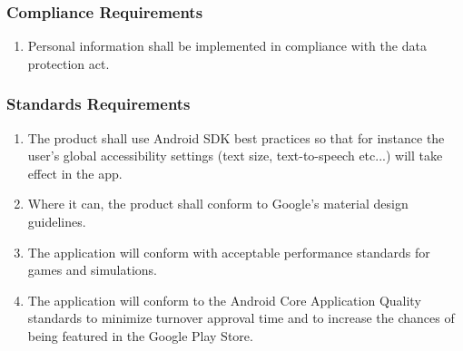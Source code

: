 \documentclass[]{article}
\begin{document}
\subsubsection{Compliance Requirements}
\label{ssub:compliance_requirements}
\begin{enumerate}[{LR}1. ]
	\item Personal information shall be implemented in compliance with the data protection act.
	\holdEnum
\end{enumerate}

\subsubsection{Standards Requirements}
\label{ssub:standards_requirements}
\begin{enumerate}[{LR}1. ]
	\resumeEnum
	\item The product shall use Android SDK best practices so that for instance the user's global accessibility settings (text size, text-to-speech etc...) will take effect in the app. 
	\item Where it can, the product shall conform to Google's material design guidelines.
	\item The application will conform with acceptable performance standards for games and simulations.
	\item The application will conform to the Android Core Application Quality standards to minimize turnover approval time and to increase the chances of being featured in the Google Play Store.
\end{enumerate}


\newpage
\appendix
\end{document}
